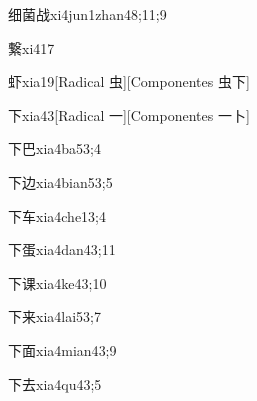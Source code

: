 \begin{verbete}{细菌战}{xi4jun1zhan4}{8;11;9}
\end{verbete}

\begin{verbete}{繋}{xi4}{17}
\end{verbete}

\begin{verbete}{虾}{xia1}{9}[Radical 虫][Componentes 虫下]
\end{verbete}

\begin{verbete}{下}{xia4}{3}[Radical 一][Componentes 一卜]
\end{verbete}

\begin{verbete}{下巴}{xia4ba5}{3;4}
\end{verbete}

\begin{verbete}{下边}{xia4bian5}{3;5}
\end{verbete}

\begin{verbete}{下车}{xia4che1}{3;4}
\end{verbete}

\begin{verbete}{下蛋}{xia4dan4}{3;11}
\end{verbete}

\begin{verbete}{下课}{xia4ke4}{3;10}
\end{verbete}

\begin{verbete}{下来}{xia4lai5}{3;7}
\end{verbete}

\begin{verbete}{下面}{xia4mian4}{3;9}
\end{verbete}

\begin{verbete}{下去}{xia4qu4}{3;5}
\end{verbete}

